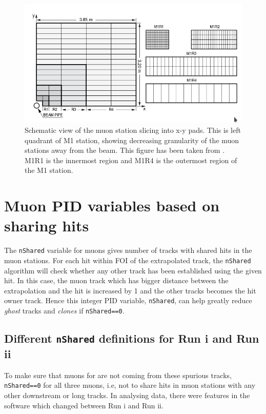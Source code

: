 \begin{figure}[!h]
        \centering
        \includegraphics[width = 1.0\textwidth]{figs/trimuon/pad.png}
        \caption{Schematic view of the muon station slicing into x-y pads. This is left quadrant of M1 station, showing decreasing granularity of the muon stations away from the beam. This figure has been taken from \cite{LHCb-DP-2012-002}. M1R1 is the innermost region and M1R4 is the outermost region of the M1 station. }
        \label{fig:pads}
\end{figure}

\section{Muon PID variables based on sharing hits}
\label{bugs}

The \texttt{nShared} variable for muons gives number of tracks with shared hits in the muon stations. For each hit within \gls{FOI} of the extrapolated track, the \texttt{nShared} algorithm will check whether any other track has been established using the given hit. In this case, the muon track which has bigger distance between the extrapolation and the hit is increased by 1 and the other tracks becomes the hit owner track. Hence this integer \gls{PID} variable, \texttt{nShared}, can help greatly reduce \textit{ghost} tracks and \textit{clones} if \texttt{nShared==0}.

\subsection{Different \texttt{nShared} definitions for Run \Rn{1} and Run \Rn{2}}
To make sure that muons for \Bmumumu are not coming from these spurious tracks,  \texttt{nShared==0} for all three muons, i.e, not to share hits in muon stations with any other downstream or long tracks. In analysing data, there were features in the software which changed between Run \Rn{1} and Run \Rn{2}.

